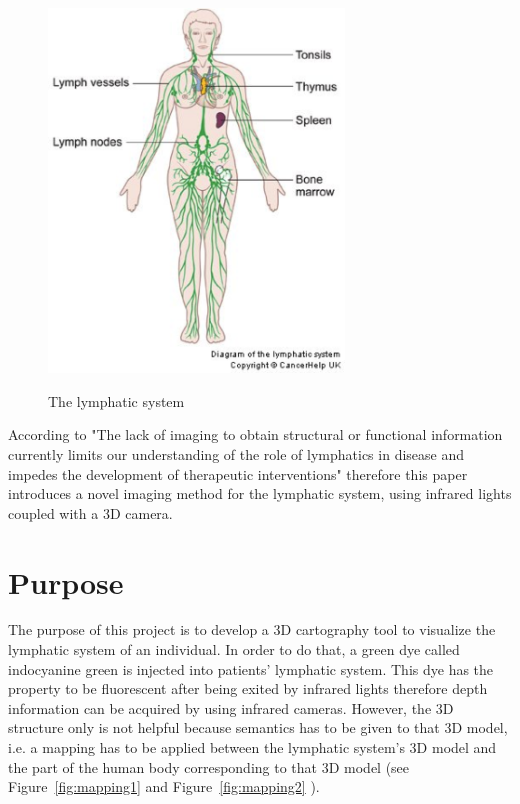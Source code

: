 \begin{figure}[h]
\caption{The lymphatic system}
\centering
    \includegraphics[width=0.7\textwidth]{images/LymphaticSystem.png}
\label{fig:The lymphatic system}
\end{figure}


According to \cite{marshall_near-infrared_2010}  "The lack of imaging to obtain structural or functional information currently limits our understanding of the role of lymphatics in disease and impedes the development of therapeutic interventions" therefore this paper introduces a novel imaging method for the lymphatic system, using infrared lights coupled with a 3D camera.

\section{Purpose}

The purpose of this project is to develop a 3D cartography tool to visualize the lymphatic system of an individual. In order to do that, a green dye called indocyanine green is injected into patients' lymphatic system. This dye has the property to be fluorescent after being exited by infrared lights therefore depth information can be acquired by using infrared cameras. However, the 3D structure only is not helpful because semantics has to be given to that 3D model, i.e. a mapping has to be applied between the lymphatic system's 3D model and the part of the human body corresponding to that 3D model (see Figure~\ref{fig:mapping1} and Figure~\ref{fig:mapping2} \cite{_gianluca_????}). 

